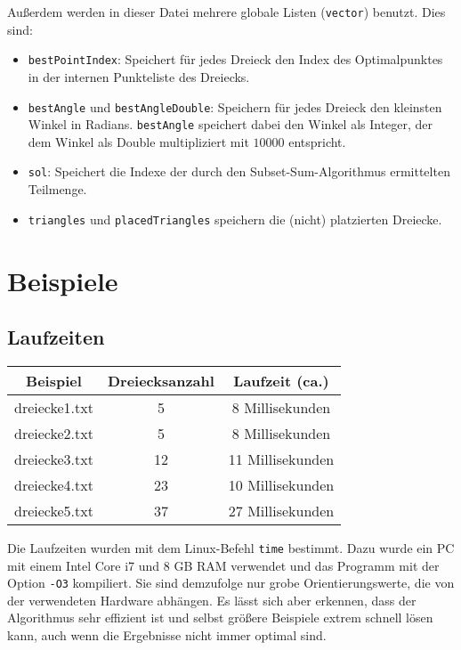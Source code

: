 \documentclass[a4paper, notitlepage, 12pt,headinclude]{scrartcl}
\begin{document}
Außerdem werden in dieser Datei mehrere globale Listen (\texttt{vector}) benutzt. Dies sind:
\begin{itemize}
	\item \texttt{bestPointIndex}: Speichert für jedes Dreieck den Index des Optimalpunktes in der internen Punkteliste des Dreiecks.
	\item \texttt{bestAngle} und \texttt{bestAngleDouble}: Speichern für jedes Dreieck den kleinsten Winkel in Radians. \texttt{bestAngle} speichert dabei den Winkel als Integer, der dem Winkel als Double multipliziert mit $10000$ entspricht.
	\item \texttt{sol}: Speichert die Indexe der durch den Subset-Sum-Algorithmus ermittelten Teilmenge.
	\item \texttt{triangles} und \texttt{placedTriangles} speichern die (nicht) platzierten Dreiecke.
\end{itemize}
\section{Beispiele}
\subsection*{Laufzeiten}
\begin{table}[H]
	\begin{tabular}{|c|c|c|} 
		\hline
		Beispiel                                      & Dreiecksanzahl & Laufzeit (ca.)       \\ \hline \hline
		dreiecke1.txt                              & 5     & 8 Millisekunden    \\
		dreiecke2.txt                              & 5      & 8 Millisekunden     \\
		dreiecke3.txt                              & 12      & 11 Millisekunden     \\
		dreiecke4.txt                              & 23      & 10 Millisekunden    \\
		dreiecke5.txt                              & 37      & 27 Millisekunden    \\ \hline
	\end{tabular}
\end{table}
Die Laufzeiten wurden mit dem Linux-Befehl \texttt{time} bestimmt. Dazu wurde ein PC mit einem Intel Core i7 und 8 GB RAM verwendet und das Programm mit der Option \texttt{-O3} kompiliert. Sie sind demzufolge nur grobe Orientierungswerte, die von der verwendeten Hardware abhängen. Es lässt sich aber erkennen, dass der Algorithmus sehr effizient ist und selbst größere Beispiele extrem schnell lösen kann, auch wenn die Ergebnisse nicht immer optimal sind.
\end{document}
